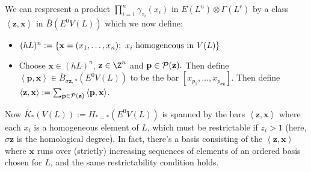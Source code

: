 \documentclass[11pt]{article}
\begin{document}
\begin{PRlieKoszulComplexCalculation}
We can respresent a product $\prod_{i=1}^{n}\gamma_{z_i}(x_i)$ in $E(L^u)\otimes \Gamma(L^r)$ by a class $\left\langle \textbf{z},\textbf{x}\right\rangle$ in $\overline{B}(E^0V(L))$ which we now define:

\begin{itemize}
\setlength{\parindent}{.25in}
\item $(hL)^n:=\{\textbf{x}=(x_1,\ldots,x_n);\ x_i\textup{ homogeneous in }V(L)\}$
\item Choose $\textbf{x}\in(hL)^n$, $\textbf{z}\in\Z^n$ and $\textbf{p}\in\mathcal{P}(\textbf{z}).$ Then define $\left\langle \textbf{p},\textbf{x}\right\rangle\in\overline{B}_{\sigma\textbf{z},*}(E^0V(L))$ to be the bar $[x_{p_1},\ldots,x_{p_{\sigma\textbf{z}}}]$. Then define $\left\langle \textbf{z},\textbf{x}\right\rangle:= \sum_{\textbf{p}\in\mathcal{P}(\textbf{z})}\left\langle \textbf{p},\textbf{x}\right\rangle$. 
\end{itemize}
Now $\overline{K}_*(V(L)):=H_{*=*}(E^0V(L))$ is spanned by the bars $\left\langle \textbf{z},\textbf{x}\right\rangle$ where each $x_i$ is a homogeneous element of $L$, which must be restrictable if $z_i>1$ (here, $\sigma\textbf{z}$ is the homological degree). In fact, there's a basis consisting of the $\left\langle \textbf{z},\textbf{x}\right\rangle$ where $\textbf{x}$ runs over (strictly) increasing sequences of elements of an ordered basis chosen for $L$, and the same restrictability condition holds.


\end{PRlieKoszulComplexCalculation}
\end{document}
